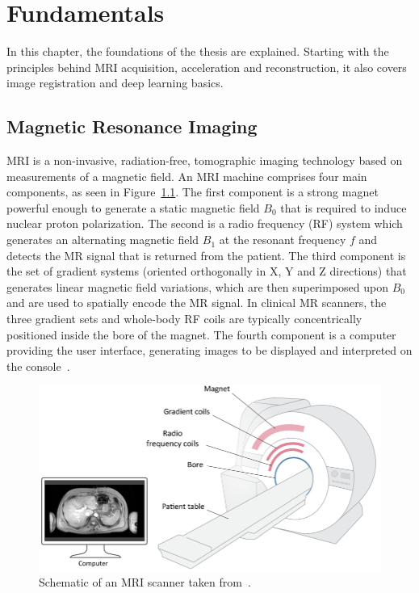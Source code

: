 
\chapter{Fundamentals} \label{Ch:Fundamentals}
In this chapter, the foundations of the thesis are explained. Starting with the principles behind MRI acquisition, acceleration and reconstruction, it also covers image registration and deep learning basics.

\section{Magnetic Resonance Imaging} \label{Sec:MRI}
MRI is a non-invasive, radiation-free, tomographic imaging technology based on measurements of a magnetic field.  An MRI machine comprises four main components, as seen in Figure~\ref{fig:MRISchematic}. The first component is a strong magnet powerful enough to generate a static magnetic field $B_0$ that is required to induce nuclear proton polarization. The second is a radio frequency (RF) system which generates an alternating magnetic field $B_1$ at the resonant frequency $f$ and detects the MR signal that is returned from the patient. The third component is the set of gradient systems (oriented orthogonally in X, Y and Z directions) that generates linear magnetic field variations, which are then superimposed upon $B_0$ and are used to spatially encode the MR signal. In clinical MR scanners, the three gradient sets and whole-body RF coils are typically concentrically positioned inside the bore of the magnet. The fourth component is a computer providing the user interface, generating images to be displayed and interpreted on the console~\cite{Serai2021}.

\begin{figure}[htpb]
 	\centering
 	\graphicspath{{images/}{\main/images/}}
 	\includegraphics[width=\linewidth]{MRI-Schematic.png} 
 	\caption{Schematic of an MRI scanner taken from~\cite{Serai2021}.}
 	\label{fig:MRISchematic}
 \end{figure} 

